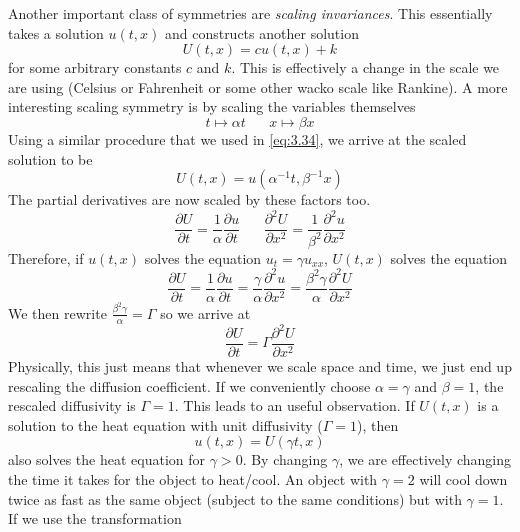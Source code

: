 \documentclass{article}
\newcommand{\pd}[2]{\frac{\partial #1}{\partial #2}}
\newcommand{\pdt}[2]{\frac{\partial ^2 #1}{\partial #2 ^2}}
\numberwithin{equation}{section}
\begin{document}
Another important class of symmetries are \textit{scaling invariances}. This essentially takes a solution $u(t,x)$ and constructs another solution 
\begin{equation}
    U(t,x) = cu(t,x)+k
\end{equation}
for some arbitrary constants $c$ and $k$. This is effectively a change in the scale we are using (Celsius or Fahrenheit or some other wacko scale like Rankine). A more interesting scaling symmetry is by scaling the variables themselves
\begin{equation}
    t \mapsto \alpha t \hspace{20pt} x\mapsto \beta x
\end{equation}
Using a similar procedure that we used in \eqref{eq:3.34}, we arrive at the scaled solution to be 
\begin{equation}
    U(t,x) = u(\alpha^{-1}t, \beta^{-1}x)
\end{equation}
The partial derivatives are now scaled by these factors too. 
\begin{equation*}
    \pd{U}{t} = \frac{1}{\alpha} \pd{u}{t} \hspace{20pt} \pdt{U}{x} = \frac{1}{\beta^2}\pdt{u}{x}
\end{equation*}
Therefore, if $u(t,x)$ solves the equation $u_t = \gamma u_{xx}$, $U(t,x)$ solves the equation 
\begin{equation}
    \pd{U}{t} = \frac{1}{\alpha} \pd{u}{t} = \frac{\gamma}{\alpha}\pdt{u}{x} = \frac{\beta^2 \gamma}{\alpha}\pdt{U}{x}
\end{equation}
We then rewrite $\frac{\beta^2 \gamma}{\alpha} =\Gamma$ so we arrive at 
\begin{equation*}
    \pd{U}{t} = \Gamma \pdt{U}{x}
\end{equation*}
Physically, this just means that whenever we scale space and time, we just end up rescaling the diffusion coefficient. If we conveniently choose $\alpha =\gamma$ and $\beta =1$, the rescaled diffusivity is $\Gamma =1$. This leads to an useful observation. If $U(t,x)$ is a solution to the heat equation with unit diffusivity ($\Gamma =1$), then 
\begin{equation*}
    u(t,x) = U(\gamma t,x)
\end{equation*}
also solves the heat equation for $\gamma > 0$. By changing $\gamma$, we are effectively changing the time it takes for the object to heat/cool. An object with $\gamma=2$ will cool down twice as fast as the same object (subject to the same conditions) but with $\gamma =1$. If we use the transformation 
\end{document}
